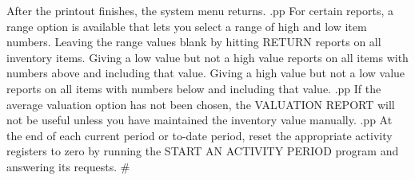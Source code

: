 After the printout finishes, the system menu returns.
.pp
For certain reports, a range option is available that lets you select
a range of high and low item numbers.  Leaving the range
values blank by hitting RETURN reports on all inventory items. Giving
a low value but not a high value reports on all items with numbers
above and including that value.  Giving a high value but not a low value
reports on all items with numbers below and including that value.
.pp
If the average valuation option has not been chosen, the VALUATION
REPORT will not be useful unless you have maintained the inventory
value manually.
.pp
At the end of each current period or to-date period, reset the
appropriate activity registers to zero by running the START AN ACTIVITY
PERIOD program and answering its requests.
#
